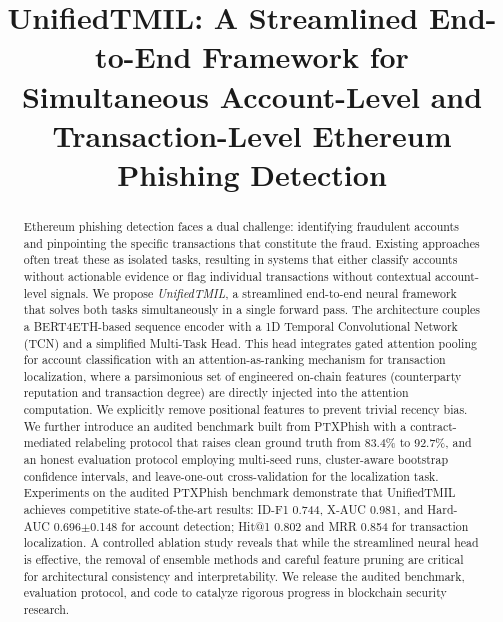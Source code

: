 \documentclass[conference]{IEEEtran}
\begin{document}
\title{UnifiedTMIL: A Streamlined End-to-End Framework for Simultaneous Account-Level and Transaction-Level Ethereum Phishing Detection}

\author{
}

\maketitle

\begin{abstract}
Ethereum phishing detection faces a dual challenge: identifying fraudulent accounts and pinpointing the specific transactions that constitute the fraud. Existing approaches often treat these as isolated tasks, resulting in systems that either classify accounts without actionable evidence or flag individual transactions without contextual account-level signals. We propose \emph{UnifiedTMIL}, a streamlined end-to-end neural framework that solves both tasks simultaneously in a single forward pass. The architecture couples a BERT4ETH-based sequence encoder with a 1D Temporal Convolutional Network (TCN) and a simplified Multi-Task Head. This head integrates gated attention pooling for account classification with an attention-as-ranking mechanism for transaction localization, where a parsimonious set of engineered on-chain features (counterparty reputation and transaction degree) are directly injected into the attention computation. We explicitly remove positional features to prevent trivial recency bias. We further introduce an audited benchmark built from PTXPhish with a contract-mediated relabeling protocol that raises clean ground truth from 83.4\% to 92.7\%, and an honest evaluation protocol employing multi-seed runs, cluster-aware bootstrap confidence intervals, and leave-one-out cross-validation for the localization task. Experiments on the audited PTXPhish benchmark demonstrate that UnifiedTMIL achieves competitive state-of-the-art results: ID-F1 0.744, X-AUC 0.981, and Hard-AUC 0.696$\pm$0.148 for account detection; Hit@1 0.802 and MRR 0.854 for transaction localization. A controlled ablation study reveals that while the streamlined neural head is effective, the removal of ensemble methods and careful feature pruning are critical for architectural consistency and interpretability. We release the audited benchmark, evaluation protocol, and code to catalyze rigorous progress in blockchain security research.
\end{abstract}
\end{document}
